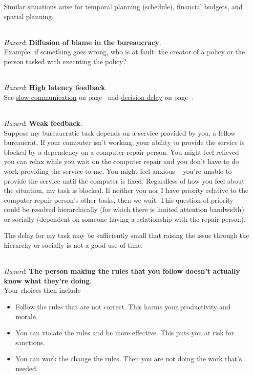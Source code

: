 Similar situations arise for temporal planning (schedule), financial budgets, and spatial planning. 


\ \\
\textit{Hazard}: \textbf{Diffusion of blame in the bureaucracy}. \\
Example: if something goes wrong, who is at fault: the creator of a policy or the person tasked with executing the policy?

\ \\

\textit{Hazard}: \textbf{High latency feedback}. \\
See 
\hyperref[sec:slowing-communication]{slow communication} on
page~\pageref{sec:slowing-communication} 
and 
\hyperref[sec:decision-delay]{decision delay} on 
page~\pageref{sec:decision-delay}.

\ \\

\textit{Hazard}: \textbf{Weak feedback}. \\
Suppose my bureaucratic task depends on a service provided by you, a fellow bureaucrat. If your computer isn't working, your ability to provide the service is blocked by a dependency on a computer repair person. You might feel relieved -- you can relax while you wait on the computer repair and you don't have to do work providing the service to me. You might feel anxious -- you're unable to provide the service until the computer is fixed. Regardless of how you feel about the situation, my task is blocked. If neither you nor I have priority relative to the computer repair person's other tasks, then we wait. This question of priority could be resolved hierarchically (for which there is limited attention bandwidth) or socially (dependent on someone having a relationship with the repair person). 

The delay for my task may be sufficiently small that raising the issue through the hierarchy or socially is not a good use of time.

\ \\

\textit{Hazard}: \textbf{The person making the rules that you follow doesn't actually know what they're doing}. \\
Your choices then include
\begin{itemize}
    \item Follow the rules that are not correct. This harms your productivity and morale. 
\item You can violate the rules and be more effective. This puts you at risk for sanctions. 
\item You can work the change the rules. Then you are not doing the work that's needed.
\end{itemize}


